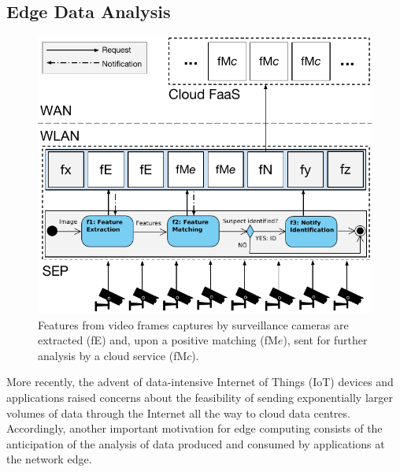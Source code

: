 \subsection{Edge Data Analysis}

\begin{figure}[tbp]
	\centering
	\includegraphics[width=\linewidth]{Figs/Edge_Data_Analytics_Video_Surveillance.pdf}
	\caption{Features from video frames captures by surveillance cameras are extracted (fE) and, upon a positive matching (fM$e$), sent for further analysis by a cloud service (fM$c$).}
	\label{fig:Edge_Data_Analytics_Video_Surveillance}
\end{figure}

More recently, the advent of data-intensive Internet of Things (IoT) devices and applications raised concerns about the feasibility of sending exponentially larger volumes of data through the Internet all the way to cloud data centres. Accordingly, another important motivation for edge computing consists of the anticipation of the analysis of data produced and consumed by applications at the network edge. 


